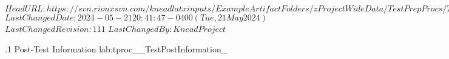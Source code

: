 \svnidlong
{$HeadURL: https://svn.riouxsvn.com/kneadlatxinputs/ExampleArtifactFolders/zProjectWideData/TestPrepProcs/TestPost_ConclusionInformation.tex $}
{$LastChangedDate: 2024-05-21 20:41:47 -0400 (Tue, 21 May 2024) $}
{$LastChangedRevision: 111 $}
{$LastChangedBy: KneadProject $}

\TestProcedure%
{\TestProcNumber.1}
{\StdTestNameX Post-Test Information}
{lab:tproc_\StdTestName_TestPostInformation_\TestProcNumber}
{
}
{
}
{
}
